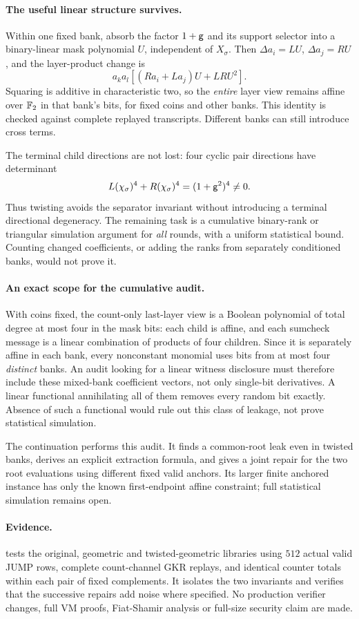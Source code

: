 \paragraph{The useful linear structure survives.} Within one fixed bank, absorb the factor $1+\mathsf{g}$ and its support selector into a binary-linear mask polynomial $U$, independent of $X_\sigma$. Then $\Delta a_i=LU$, $\Delta a_j=RU$, and the layer-product change is
\[
 a_k a_l\left[(Ra_i+La_j)U+LRU^2\right].
\]
Squaring is additive in characteristic two, so the \emph{entire} layer view remains affine over $\mathbb{F}_2$ in that bank's bits, for fixed coins and other banks. This identity is checked against complete replayed transcripts. Different banks can still introduce cross terms.

The terminal child directions are not lost: four cyclic pair directions have determinant
\[
 L(\chi_\sigma)^4+R(\chi_\sigma)^4=(1+\mathsf{g}^2)^4\ne0.
\]
Thus twisting avoids the separator invariant without introducing a terminal directional degeneracy. The remaining task is a cumulative binary-rank or triangular simulation argument for \emph{all} rounds, with a uniform statistical bound. Counting changed coefficients, or adding the ranks from separately conditioned banks, would not prove it.

\paragraph{An exact scope for the cumulative audit.} With coins fixed, the count-only last-layer view is a Boolean polynomial of total degree at most four in the mask bits: each child is affine, and each sumcheck message is a linear combination of products of four children. Since it is separately affine in each bank, every nonconstant monomial uses bits from at most four \emph{distinct} banks. An audit looking for a linear witness disclosure must therefore include these mixed-bank coefficient vectors, not only single-bit derivatives. A linear functional annihilating all of them removes every random bit exactly. Absence of such a functional would rule out this class of leakage, not prove statistical simulation.

The continuation  performs this audit. It finds a common-root leak even in twisted banks, derives an explicit extraction formula, and gives a joint repair for the two root evaluations using different fixed valid anchors. Its larger finite anchored instance has only the known first-endpoint affine constraint; full statistical simulation remains open.

\paragraph{Evidence.}  tests the original, geometric and twisted-geometric libraries using $512$ actual valid JUMP rows, complete count-channel GKR replays, and identical counter totals within each pair of fixed complements. It isolates the two invariants and verifies that the successive repairs add noise where specified. No production verifier changes, full VM proofs, Fiat-Shamir analysis or full-size security claim are made.
